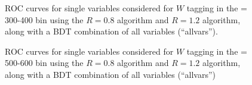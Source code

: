 \begin{figure}
\centering
{}
\caption{ROC curves for single variables considered for $W$
tagging in the \pt = 300-400 \GeV bin using the \antikt $R=0.8$ algorithm and $R=1.2$ algorithm, along with a BDT combination of all variables (``allvars'').}
\label{fig:pt300_single}
\end{figure}


\begin{figure}
\centering
{}
\caption{ROC curves for single variables considered for $W$
tagging in the \pt = 500-600 \GeV bin using the \antikt $R=0.8$ algorithm and $R=1.2$ algorithm, along with a BDT combination of all variables (``allvars'')}
\label{fig:pt500_single}
\end{figure}

